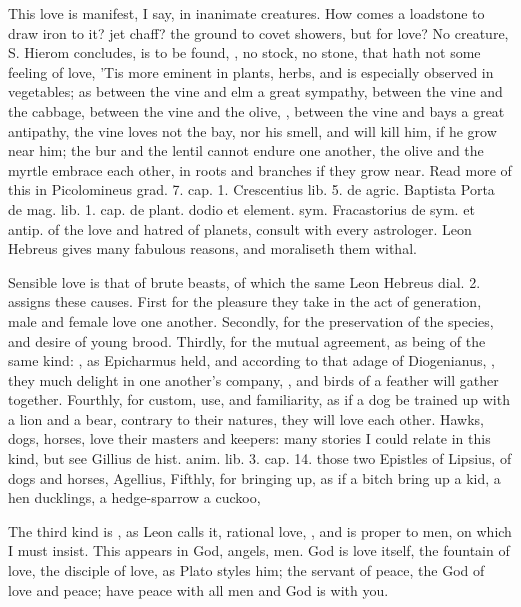 {This love is manifest, I say, in inanimate creatures. How comes a
loadstone to draw iron to it? jet chaff? the ground to covet showers,
but for love? No creature, S. Hierom concludes, is to be found, , no stock, no stone, that hath not some feeling of
love, 'Tis more eminent in plants, herbs, and is especially observed in
vegetables; as between the vine and elm a great sympathy, between the
vine and the cabbage, between the vine and the olive,  , between the vine and bays a great antipathy, the vine
loves not the bay, nor his smell, and will kill him, if he grow
near him; the bur and the lentil cannot endure one another, the olive
and the myrtle embrace each other, in roots and branches if they
grow near. Read more of this in Picolomineus grad. 7. cap. 1.
Crescentius lib. 5. de agric. Baptista Porta de mag. lib. 1. cap. de
plant. dodio et element. sym. Fracastorius de sym. et antip. of the
love and hatred of planets, consult with every astrologer. Leon Hebreus
gives many fabulous reasons, and moraliseth them withal.

Sensible love is that of brute beasts, of which the same Leon Hebreus
dial. 2. assigns these causes. First for the pleasure they take in the
act of generation, male and female love one another. Secondly, for the
preservation of the species, and desire of young brood. Thirdly, for
the mutual agreement, as being of the same kind: , as Epicharmus held, and
according to that adage of Diogenianus, , they much delight in one another's company, , and birds of a feather will gather
together. Fourthly, for custom, use, and familiarity, as if a dog be
trained up with a lion and a bear, contrary to their natures, they will
love each other. Hawks, dogs, horses, love their masters and keepers:
many stories I could relate in this kind, but see Gillius de hist.
anim. lib. 3. cap. 14. those two Epistles of Lipsius, of dogs and
horses, Agellius, \etc{} Fifthly, for bringing up, as if a bitch bring up
a kid, a hen ducklings, a hedge-sparrow a cuckoo, \etc{}

The third kind is , as Leon calls it, rational love,
, and is proper to men, on which I must insist. This
appears in God, angels, men. God is love itself, the fountain of love,
the disciple of love, as Plato styles him; the servant of peace, the
God of love and peace; have peace with all men and God is with you.

}
